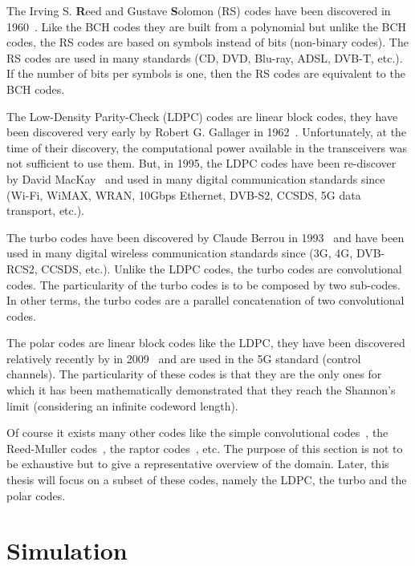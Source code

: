 The Irving S. \textbf{R}eed and Gustave \textbf{S}olomon (RS) codes have been
discovered in 1960~\cite{Reed1960}. Like the BCH codes they are built from a
polynomial but unlike the BCH codes, the RS codes are based on symbols instead
of bits (non-binary codes). The RS codes are used in many standards (CD, DVD,
Blu-ray, ADSL, DVB-T, etc.). If the number of bits per symbols is one, then the
RS codes are equivalent to the BCH codes.

The Low-Density Parity-Check (LDPC) codes are linear block codes, they have been
discovered very early by Robert G. Gallager in 1962~\cite{Gallager1962}.
Unfortunately, at the time of their discovery, the computational power available
in the transceivers was not sufficient to use them. But, in 1995, the LDPC codes
have been re-discover by David MacKay~\cite{MacKay1995} and used in many digital
communication standards since (Wi-Fi, WiMAX, WRAN, 10Gbps Ethernet, DVB-S2,
CCSDS, 5G data transport, etc.).

The turbo codes have been discovered by Claude Berrou in 1993~\cite{Berrou1993}
and have been used in many digital wireless communication standards since (3G,
4G, DVB-RCS2, CCSDS, etc.). Unlike the LDPC codes, the turbo codes are
convolutional codes. The particularity of the turbo codes is to be composed by
two sub-codes. In other terms, the turbo codes are a parallel concatenation of
two convolutional codes.

The polar codes are linear block codes like the LDPC, they have been discovered
relatively recently by \Arikan in 2009~\cite{Arikan2009} and are used in the
5G standard (control channels). The particularity of these codes is that they
are the only ones for which it has been mathematically demonstrated that they
reach the Shannon's limit (considering an infinite codeword length).

Of course it exists many other codes like the simple convolutional
codes~\cite{Elias1955}, the Reed-Muller codes~\cite{Muller1954,Reed1954}, the
raptor codes~\cite{Shokrollahi2004}, etc. The purpose of this section is not to
be exhaustive but to give a representative overview of the domain. Later, this
thesis will focus on a subset of these codes, namely the LDPC, the turbo and the
polar codes.

\section{Simulation}

